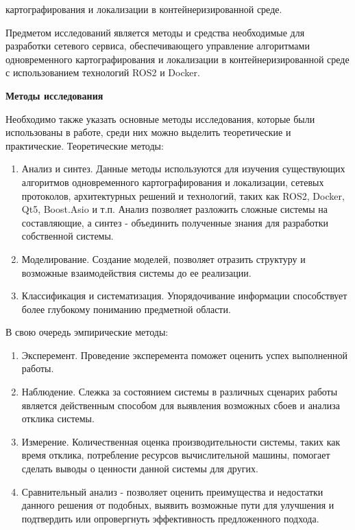 \documentclass[a4paper, 14pt]{extreport}
\begin{document}
 картографирования и локализации в контейнеризированной среде.
\par Предметом исследований является методы и средства необходимые для разработки сетевого сервиса, обеспечивающего управление алгоритмами
 одновременного картографирования и локализации в контейнеризированной среде с использованием технологий ROS2 и Docker.
\vspace{2mm}
\par\noindent\textbf{Методы исследования}
\vspace{2mm}
\par Необходимо также указать основные методы исследования, которые были использованы в работе, среди них можно выделить теоретические и 
практические. Теоретические методы:
\begin{enumerate}
        \item Анализ и синтез. Данные методы используются для изучения существующих алгоритмов одновременного картографирования и
              локализации, сетевых протоколов, архитектурных решений и технологий, таких как ROS2, Docker, Qt5, Boost.Asio\cite{asioBook}\cite{asioPap} и т.п.
              Анализ позволяет разложить сложные системы на составляющие, а синтез - объединить полученные знания для разработки 
              собственной системы.
        \item Моделирование. Создание моделей, позволяет отразить структуру и возможные взаимодействия системы до ее реализации.
        \item Классификация и систематизация. Упорядочивание информации способствует более глубокому пониманию предметной области.
\end{enumerate}
\par\noindent В свою очередь эмпирические методы:
\begin{enumerate}
        \item Эксперемент. Проведение эксперемента поможет оценить успех выполненной работы.
        \item Наблюдение. Слежка за состоянием системы в различных сценарих работы является действенным способом для выявления
              возможных сбоев и анализа отклика системы.
        \item Измерение. Количественная оценка производительности системы, таких как время отклика, потребление ресурсов вычислительной
              машины, помогает сделать выводы о ценности данной системы для других.
        \item Сравнительный анализ - позволяет оценить преимущества и недостатки данного решения от подобных, выявить возможные пути 
              для улучшения и подтвердить или опровергнуть эффективность предложенного подхода.
\end{enumerate}
\end{document}
